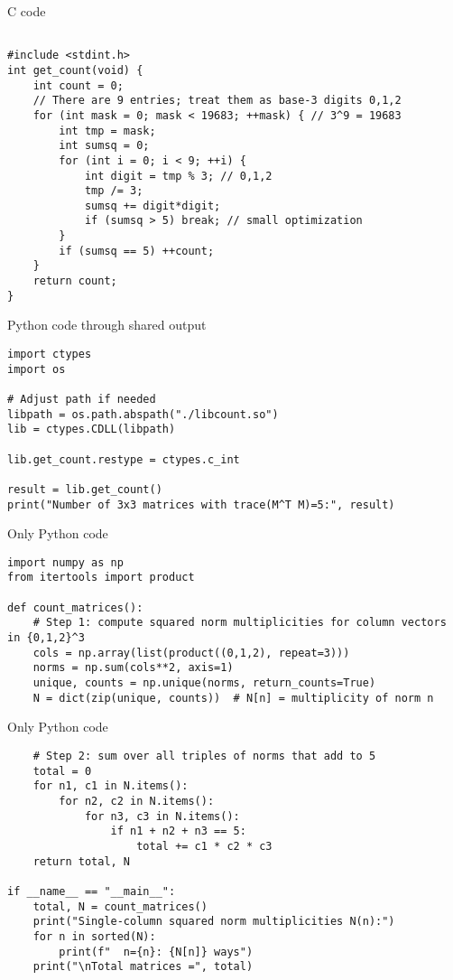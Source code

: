\documentclass{beamer}
\begin{document}
\begin{frame}[fragile]{C code}
\begin{lstlisting}

#include <stdint.h>
int get_count(void) {
    int count = 0;
    // There are 9 entries; treat them as base-3 digits 0,1,2
    for (int mask = 0; mask < 19683; ++mask) { // 3^9 = 19683
        int tmp = mask;
        int sumsq = 0;
        for (int i = 0; i < 9; ++i) {
            int digit = tmp % 3; // 0,1,2
            tmp /= 3;
            sumsq += digit*digit;
            if (sumsq > 5) break; // small optimization
        }
        if (sumsq == 5) ++count;
    }
    return count;
}
\end{lstlisting}
\end{frame}
\begin{frame}[fragile]{Python code through shared output}
\begin{lstlisting}
import ctypes
import os

# Adjust path if needed
libpath = os.path.abspath("./libcount.so")
lib = ctypes.CDLL(libpath)

lib.get_count.restype = ctypes.c_int

result = lib.get_count()
print("Number of 3x3 matrices with trace(M^T M)=5:", result)
\end{lstlisting}
\end{frame}
\begin{frame}[fragile]{Only Python code}
\begin{lstlisting}
import numpy as np
from itertools import product

def count_matrices():
    # Step 1: compute squared norm multiplicities for column vectors in {0,1,2}^3
    cols = np.array(list(product((0,1,2), repeat=3)))
    norms = np.sum(cols**2, axis=1)
    unique, counts = np.unique(norms, return_counts=True)
    N = dict(zip(unique, counts))  # N[n] = multiplicity of norm n
    \end{lstlisting}
\end{frame}
\begin{frame}[fragile]{Only Python code}
\begin{lstlisting}
    # Step 2: sum over all triples of norms that add to 5
    total = 0
    for n1, c1 in N.items():
        for n2, c2 in N.items():
            for n3, c3 in N.items():
                if n1 + n2 + n3 == 5:
                    total += c1 * c2 * c3
    return total, N

if __name__ == "__main__":
    total, N = count_matrices()
    print("Single-column squared norm multiplicities N(n):")
    for n in sorted(N):
        print(f"  n={n}: {N[n]} ways")
    print("\nTotal matrices =", total)
\end{lstlisting}
\end{frame}
\end{document}
